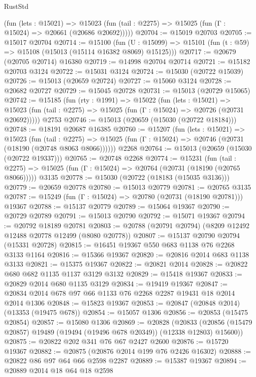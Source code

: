 \begin{lexlean}{RustStd}
\begin{coremodule}
      (fun (lets : @15021) =>
      @15023 (fun (tail : @2275) => @15025 (fun (Γ : @15024) => @20661 (@20686 @20692)))))
@20704 := @15019 @20703
@20705 := @15017 @20704
@20714 := @15100
    (fun (U : @15099) => @15101 (fun (t : @59) => @15108 (@15013 (@15114 @16382 @8069) @15125)))
@20717 := @20679 (@20705 @20714) @16380
@20719 := @14998 @20704 @20714
@20721 := @15182 @20703 @3124
@20722 := @15031 @3124
@20724 := @15030 (@20722 @15039)
@20726 := @15013 (@20659 @20724)
@20727 := @15060 @3124
@20728 := @20682 @20727
@20729 := @15045 @20728
@20731 := @15013 (@20729 @15065)
@20742 := @15185
    (fun (rty : @1991) =>
    @15022
      (fun (lets : @15021) =>
      @15023 (fun (tail : @2275) => @15025 (fun (Γ : @15024) => @20726 (@20731 @20692)))))
    @2753
@20746 := @15013 (@20659 (@15030 (@20722 @18184)))
@20748 := @18191 @20687 @16385
@20760 := @15207
    (fun (lets : @15021) =>
    @15023
      (fun (tail : @2275) =>
      @15025 (fun (Γ : @15024) => @20746 (@20731 (@18190 (@20748 @8063 @8066))))))
    @2268
@20764 := @15013 (@20659 (@15030 (@20722 @19337)))
@20765 := @20748 @2268
@20774 := @15231
    (fun (tail : @2275) => @15025 (fun (Γ : @15024) => @20764 (@20731 (@18190 (@20765 @8066)))))
    @3135
@20778 := @15030 (@20722 (@18183 (@15035 @3136)))
@20779 := @20659 @20778
@20780 := @15013 @20779
@20781 := @20765 @3135
@20787 := @15249 (fun (Γ : @15024) => @20780 (@20731 (@18190 @20781))) @19367
@20788 := @15137 @20779
@20789 := @15064 @19367
@20790 := @20729 @20789
@20791 := @15013 @20790
@20792 := @15071 @19367
@20794 := @20792 @18189 @20781
@20803 := @20788 (@20791 @20794) (@8209 @12492 @12488 @20778 @12499 (@8080 @20778))
@20807 := @15137 @20790 @20794 (@15331 @20728)
@20815 := @16451 @19367 @550 @683 @1138 @76 @2268 @3133 @1164
@20816 := @15366 @19367
@20820 := @20816 @2014 @683 @1138 @3133
@20821 := @15375 @19367
@20822 := @20821 @2014
@20828 := @20822 @680 @682 @1135 @1137 @3129 @3132
@20829 := @15418 @19367
@20833 := @20829 @2014 @680 @1135 @3129
@20834 := @19419 @19367
@20847 := @20834 @2014 @678 @97 @66 @1133 @76 @2268 @2287 @19431 @18 @2014 @2014 @1306
@20848 := @15823 @19367
@20853 := @20847 (@20848 @2014) (@13353 (@19475 @678))
@20854 := @15057 @1306
@20856 := @20853 (@15475 @20854)
@20857 := @15080 @1306
@20869 := @20828
    (@20833 (@20856 (@15479 @20857) @19489 (@19494 (@19496 @678 @20349)) (@12338 @12803) @15600))
@20875 := @20822 @202 @341 @76 @67 @2427 @2600
@20876 := @15720 @19367
@20882 := @20875 (@20876 @2014 @199 @76 @2426 @16302)
@20888 := @20822 @86 @97 @64 @66 @2598 @2287
@20889 := @15387 @19367
@20894 := @20889 @2014 @18 @64 @18 @2598

\end{coremodule}
\end{lexlean}
